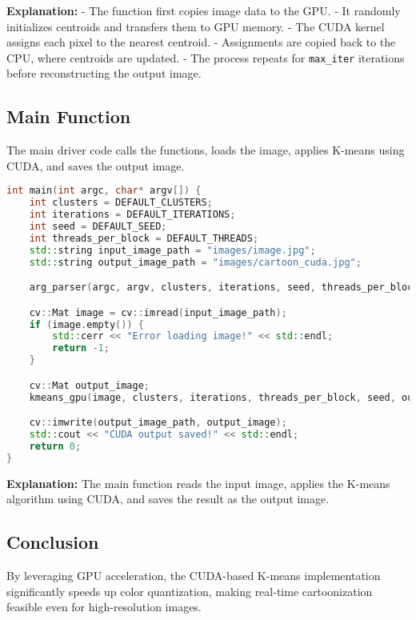 \textbf{Explanation:}
- The function first copies image data to the GPU.
- It randomly initializes centroids and transfers them to GPU memory.
- The CUDA kernel assigns each pixel to the nearest centroid.
- Assignments are copied back to the CPU, where centroids are updated.
- The process repeats for \texttt{max\_iter} iterations before reconstructing the output image.

\subsection{Main Function}
The main driver code calls the functions, loads the image, applies K-means using CUDA, and saves the output image.

\begin{lstlisting}[language=C++]
int main(int argc, char* argv[]) {
    int clusters = DEFAULT_CLUSTERS;
    int iterations = DEFAULT_ITERATIONS;
    int seed = DEFAULT_SEED;
    int threads_per_block = DEFAULT_THREADS;
    std::string input_image_path = "images/image.jpg";
    std::string output_image_path = "images/cartoon_cuda.jpg";

    arg_parser(argc, argv, clusters, iterations, seed, threads_per_block, input_image_path, output_image_path);

    cv::Mat image = cv::imread(input_image_path);
    if (image.empty()) {
        std::cerr << "Error loading image!" << std::endl;
        return -1;
    }

    cv::Mat output_image;
    kmeans_gpu(image, clusters, iterations, threads_per_block, seed, output_image);

    cv::imwrite(output_image_path, output_image);
    std::cout << "CUDA output saved!" << std::endl;
    return 0;
}
\end{lstlisting}

\textbf{Explanation:}
The main function reads the input image, applies the K-means algorithm using CUDA, and saves the result as the output image.

\subsection{Conclusion}
By leveraging GPU acceleration, the CUDA-based K-means implementation significantly speeds up color quantization, making real-time cartoonization feasible even for high-resolution images.

